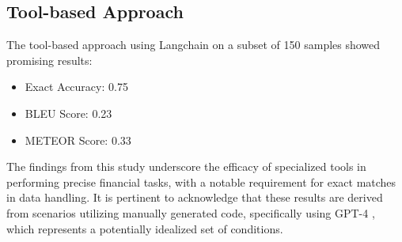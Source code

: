 \documentclass[logo,msc]{infthesis}           %
\begin{document}
\begin{comment}
\subsection{Example Type Distributions}
Table 5.3 presents the distribution and weights of different example types used in the experiments.

The diverse distributions across different result sets enable analysis of how example selection strategies influence model performance. By adjusting the weights allocated to various types, we conducted distinct experiments during inference. The specific weights assigned to each example type are detailed in parentheses in Table 5.3.
\begin{table}[h!]
\centering
\caption{Example Type Distributions and Weights}
\label{tab:example_weights}
\begin{tabular}{>{\raggedright}p{2.5cm}cccc}
\toprule
\textbf{Results} & \textbf{Combined} & \textbf{Relevant } & \textbf{Randomized} & \textbf{Baseline} \\
\midrule
Results 1 & 341 (0.25) & 304 (0.25) & 325 (0.25) & 317 (0.25) \\
Results 2 & 147 (0.10) & 324 (0.25) & 499 (0.40) & 317 (0.25) \\
Results 3 & 338 (0.25) & 616 (0.50) & 197 (0.15) & 136 (0.10) \\
\bottomrule
\end{tabular}
\end{table}
\end{comment}



\subsection{Tool-based Approach}

The tool-based approach using Langchain on a subset of 150 samples showed promising results:
\begin{itemize}
   \item Exact Accuracy: 0.75
   \item BLEU Score: 0.23
   \item METEOR Score: 0.33
\end{itemize}
The findings from this study underscore the efficacy of specialized tools in performing precise financial tasks, with a notable requirement for exact matches in data handling. It is pertinent to acknowledge that these results are derived from scenarios utilizing manually generated code, specifically using GPT-4 \cite{openai2024gpt4technicalreport}, which represents a potentially idealized set of conditions.
\end{document}
